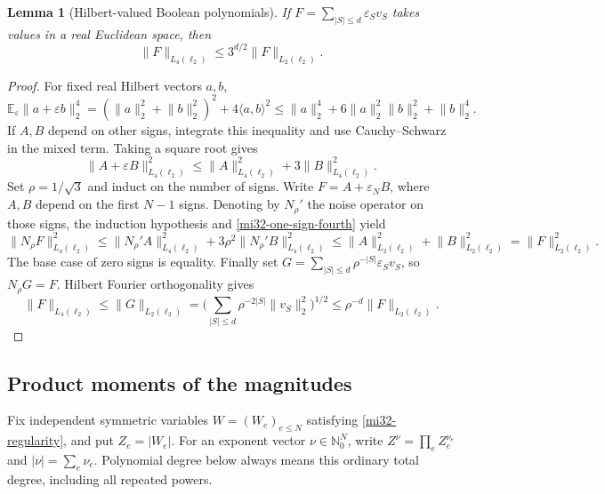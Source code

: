 \documentclass[11pt]{article}
\newtheorem{lemma}[theorem]{Lemma}
\theoremstyle{definition}
\theoremstyle{remark}
\newcommand{\E}{\mathbb E}
\newcommand{\norm}[1]{\lVert#1\rVert}
\newcommand{\ip}[2]{\langle#1,#2\rangle}
\begin{document}
\begin{lemma}[Hilbert-valued Boolean polynomials]
\label{mi32-hilbert-boolean}
If $F=\sum_{|S|\le d}\varepsilon_S v_S$ takes values in a real
Euclidean space, then
\begin{equation}\label{mi32-hilbert-boolean-bound}
 \norm{F}_{L_4(\ell_2)}\le3^{d/2}\norm{F}_{L_2(\ell_2)}.
\end{equation}
\end{lemma}
\begin{proof}
For fixed real Hilbert vectors $a,b$,
\[
 \E_\varepsilon\norm{a+\varepsilon b}_2^4
 =(\norm{a}_2^2+\norm{b}_2^2)^2+4\ip{a}{b}^2
 \le\norm{a}_2^4+6\norm{a}_2^2\norm{b}_2^2+\norm{b}_2^4.
\]
If $A,B$ depend on other signs, integrate this inequality and use
Cauchy--Schwarz in the mixed term. Taking a square root gives
\begin{equation}\label{mi32-one-sign-fourth}
 \norm{A+\varepsilon B}_{L_4(\ell_2)}^2
 \le\norm{A}_{L_4(\ell_2)}^2+3\norm{B}_{L_4(\ell_2)}^2.
\end{equation}
Set $\rho=1/\sqrt3$ and induct on the number of signs. Write
$F=A+\varepsilon_N B$, where $A,B$ depend on the first $N-1$ signs.
Denoting by $N_\rho'$ the noise operator on those signs, the induction
hypothesis and \eqref{mi32-one-sign-fourth} yield
\[
 \norm{N_\rho F}_{L_4(\ell_2)}^2
 \le\norm{N_\rho'A}_{L_4(\ell_2)}^2
        +3\rho^2\norm{N_\rho'B}_{L_4(\ell_2)}^2
 \le\norm{A}_{L_2(\ell_2)}^2+\norm{B}_{L_2(\ell_2)}^2
 =\norm{F}_{L_2(\ell_2)}^2.
\]
The base case of zero signs is equality. Finally set
$G=\sum_{|S|\le d}\rho^{-|S|}\varepsilon_Sv_S$, so $N_\rho G=F$.
Hilbert Fourier orthogonality gives
\[
 \norm{F}_{L_4(\ell_2)}
 \le\norm{G}_{L_2(\ell_2)}
 =\Big(\sum_{|S|\le d}\rho^{-2|S|}\norm{v_S}_2^2\Big)^{1/2}
 \le\rho^{-d}\norm{F}_{L_2(\ell_2)}.
\]
\end{proof}

\subsection{Product moments of the magnitudes}

Fix independent symmetric variables $W=(W_e)_{e\le N}$ satisfying
\eqref{mi32-regularity}, and put $Z_e=|W_e|$. For an exponent vector
$\nu\in\mathbb N_0^N$, write $Z^\nu=\prod_e Z_e^{\nu_e}$ and
$|\nu|=\sum_e\nu_e$. Polynomial degree below always means this
ordinary total degree, including all repeated powers.
\end{document}
